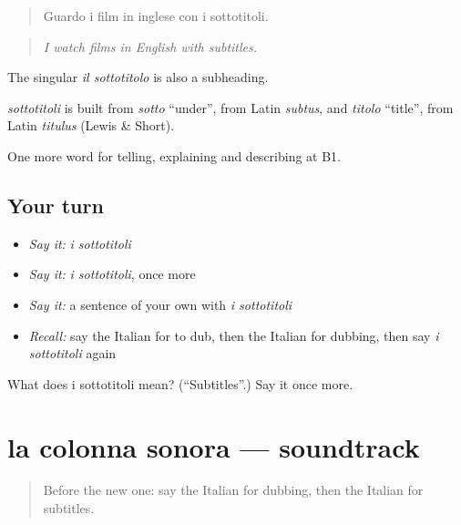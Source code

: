 \begin{quote}
Guardo i film in inglese con i sottotitoli.
\end{quote}

\begin{quote}
\emph{I watch films in English with subtitles.}
\end{quote}

The singular \emph{il sottotitolo} is also a subheading.

\begin{cousinweb}
\emph{sottotitoli} is built from \emph{sotto} \textquotedblleft{}under\textquotedblright{}, from Latin \emph{subtus}, and \emph{titolo} \textquotedblleft{}title\textquotedblright{}, from Latin \emph{titulus} (Lewis \& Short).
\end{cousinweb}

\begin{grammarlens}[title={What you've built}]
One more word for telling, explaining and describing at B1.
\end{grammarlens}

\subsection*{Your turn}
\begin{itemize}
\raggedright
  \item \emph{Say it:} \emph{i sottotitoli}
  \item \emph{Say it:} \emph{i sottotitoli}, once more
  \item \emph{Say it:} a sentence of your own with \emph{i sottotitoli}
  \item \emph{Recall:} say the Italian for to dub, then the Italian for dubbing, then say \emph{i sottotitoli} again
\end{itemize}

\begin{tcolorbox}[breakable,colback=teal!4,colframe=teal!35!black,title={Before you move on}]
What does i sottotitoli mean? (\textquotedblleft{}Subtitles\textquotedblright{}.) Say it once more.
\end{tcolorbox}
\section[la colonna sonora]{la colonna sonora — soundtrack}

\label{lesson:IT-C529-colonna-sonora}



\begin{quote}
Before the new one: say the Italian for dubbing, then the Italian for subtitles.
\end{quote}

